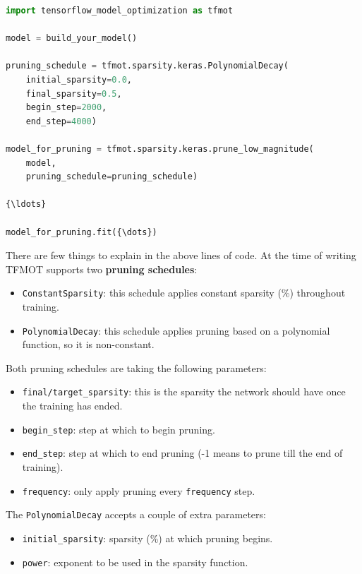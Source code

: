 \begin{lstlisting}[language=Python, caption=Pruning API in TFMOT]
import tensorflow_model_optimization as tfmot

model = build_your_model()

pruning_schedule = tfmot.sparsity.keras.PolynomialDecay(
    initial_sparsity=0.0,
    final_sparsity=0.5,
    begin_step=2000,
    end_step=4000)

model_for_pruning = tfmot.sparsity.keras.prune_low_magnitude(
    model,
    pruning_schedule=pruning_schedule)

{\ldots}

model_for_pruning.fit({\dots})
\end{lstlisting}

There are few things to explain in the above lines of code. At the time of
writing TFMOT supports two \textbf{pruning schedules}:

\begin{itemize}
    \item \texttt{ConstantSparsity}: this schedule applies constant sparsity
        (\%) throughout training.
    \item \texttt{PolynomialDecay}: this schedule applies pruning based on a
        polynomial function, so it is non-constant.
\end{itemize}

Both pruning schedules are taking the following parameters:

\begin{itemize}
    \item \texttt{final/target\_sparsity}: this is the sparsity the network
        should have once the training has ended.
    \item \texttt{begin\_step}: step at which to begin pruning.
    \item \texttt{end\_step}: step at which to end pruning (-1 means to prune
        till the end of training).
    \item \texttt{frequency}: only apply pruning every \texttt{frequency} step.
\end{itemize}

The \texttt{PolynomialDecay} accepts a couple of extra parameters:

\begin{itemize}
    \item \texttt{initial\_sparsity}: sparsity (\%) at which pruning begins.
    \item \texttt{power}: exponent to be used in the sparsity function.
\end{itemize}

